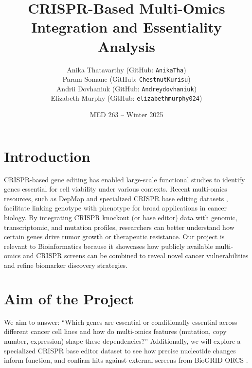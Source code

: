 \documentclass[11pt,a4paper]{article}
\title{CRISPR-Based Multi-Omics Integration and Essentiality Analysis}
\author{%
  Anika Thatavarthy (GitHub: \texttt{AnikaTha})\\
  Param Somane (GitHub: \texttt{ChestnutKurisu})\\
  Andrii Dovhaniuk (GitHub: \texttt{Andreydovhaniuk})\\
  Elizabeth Murphy (GitHub: \texttt{elizabethmurphy024})
}
\date{MED 263 -- Winter 2025}
\begin{document}
\maketitle

\section{Introduction}
\noindent
CRISPR-based gene editing has enabled large-scale functional studies to identify genes essential for cell viability under various contexts. Recent multi-omics resources, such as DepMap \cite{depmap2024} and specialized CRISPR base editing datasets \cite{yanyyyy3}, facilitate linking genotype with phenotype for broad applications in cancer biology. By integrating CRISPR knockout (or base editor) data with genomic, transcriptomic, and mutation profiles, researchers can better understand how certain genes drive tumor growth or therapeutic resistance. Our project is relevant to Bioinformatics because it showcases how publicly available multi-omics and CRISPR screens can be combined to reveal novel cancer vulnerabilities and refine biomarker discovery strategies.

\section{Aim of the Project}
\noindent
We aim to answer: ``Which genes are essential or conditionally essential across different cancer cell lines and how do multi-omics features (mutation, copy number, expression) shape these dependencies?'' Additionally, we will explore a specialized CRISPR base editor dataset to see how precise nucleotide changes inform function, and confirm hits against external screens from BioGRID ORCS \cite{biogridORCS}.
\end{document}
